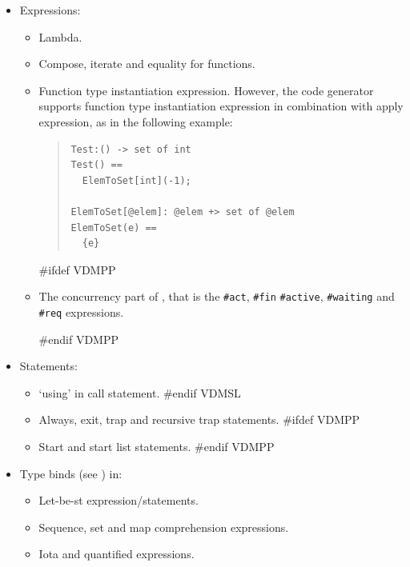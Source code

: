 \documentclass[\pformat,12pt]{article}
\begin{document}
\begin{itemize}

\item Expressions:

  \begin{itemize}
  \item Lambda.
  \item Compose,  iterate and equality for functions.
  \item Function type instantiation expression. However, the code
    generator supports function type instantiation expression in
    combination with apply expression, as in the following example:

\begin{quote}
\begin{verbatim}
Test:() -> set of int
Test() ==
  ElemToSet[int](-1);

ElemToSet[@elem]: @elem +> set of @elem
ElemToSet(e) ==
  {e}
\end{verbatim}
\end{quote}

#ifdef VDMPP
\item The concurrency part of \VDM{}, that is the
 {\tt \#act}, {\tt \#fin} {\tt \#active}, {\tt \#waiting} and
  {\tt \#req} expressions.

#endif VDMPP
  \end{itemize}

\item Statements: 

  \begin{itemize}
#ifdef VDMSL
  \item `{\sf using}' in call statement.
#endif VDMSL
  \item Always, exit, trap and recursive trap statements.
#ifdef VDMPP
  \item Start and start list statements.
#endif VDMPP
  \end{itemize}

\item Type binds (see \langmancite) in:

  \begin{itemize}
  \item Let-be-st expression/statements.
  \item Sequence, set and map comprehension expressions.
  \item Iota and quantified expressions.
  \end{itemize}


\end{itemize}
\end{document}
